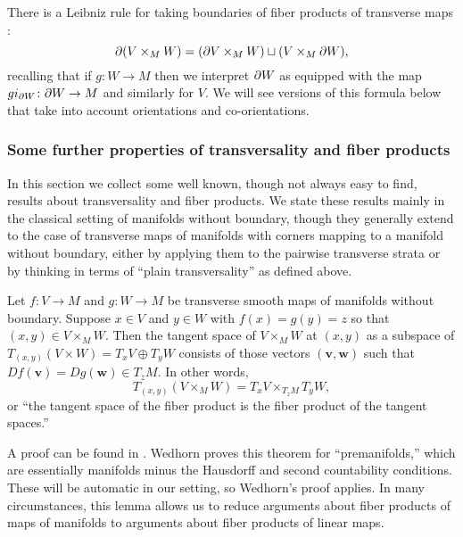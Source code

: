 There is a Leibniz rule for taking boundaries of fiber products of transverse maps \cite[Proposition~6.7]{Joy12}:
\begin{equation}\label{E: product boundary}
	\partial(V \times _M W) = (\partial V \times _M W) \sqcup (V \times _M \partial W),
\end{equation}
recalling that if $g \colon W \to M$ then we interpret $\partial W$ as equipped with the map $gi_{\partial W} \colon \partial W \to M$ and similarly for $V$.
We will see versions of this formula below that take into account orientations and co-orientations.

\subsubsection{Some further properties of transversality and fiber products}

In this section we collect some well known, though not always easy to find, results about transversality and fiber products.
We state these results mainly in the classical setting of manifolds without boundary, though they generally extend to the case of transverse maps of manifolds with corners mapping to a manifold without boundary, either by applying them to the pairwise transverse strata or by thinking in terms of ``plain transversality'' as defined above.

\begin{lemma}\label{L: tangent of pullbacks}
	Let $f \colon V \to M$ and $g \colon W \to M$ be transverse smooth maps of manifolds without boundary.
	Suppose $x \in V$ and $y \in W$ with $f(x) = g(y) = z$ so that $(x,y) \in V \times _MW$.
	Then the tangent space of $V \times _MW$ at $(x,y)$ as a subspace of $T_{(x,y)}(V \times W) = T_xV \oplus T_yW$ consists of those vectors $(\mathbf v,\mathbf w)$ such that $Df(\mathbf v) = Dg(\mathbf w) \in T_zM$.
	In other words,
	$$T_{(x,y)}(V \times _MW) = T_xV \times _{T_zM}T_yW,$$
	or ``the tangent space of the fiber product is the fiber product of the tangent spaces.''
\end{lemma}

A proof can be found in \cite[Theorem 5.47]{Wed16}.
Wedhorn proves this theorem for ``premanifolds,'' which are essentially manifolds minus the Hausdorff and second countability conditions.
These will be automatic in our setting, so Wedhorn's proof applies.
In many circumstances, this lemma allows us to reduce arguments about fiber products of maps of manifolds to arguments about fiber products of linear maps.

